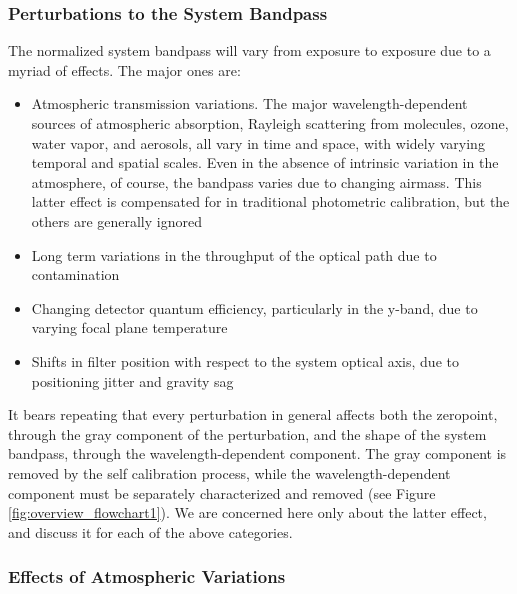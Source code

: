 \documentclass[12pt,preprint]{aastex}
\begin{document}
\subsubsection{Perturbations to the System Bandpass}
The normalized system bandpass will vary from exposure to exposure due to a myriad of effects.  The major ones are:
\begin{itemize}
\item{Atmospheric transmission variations.  The major wavelength-dependent sources of atmospheric absorption, Rayleigh scattering from molecules, ozone, water vapor, and aerosols, all vary in time and space, with widely varying temporal and spatial scales.  Even in the absence of intrinsic variation in the atmosphere, of course, the bandpass varies due to changing airmass.  This latter effect is compensated for in traditional photometric calibration, but the others are generally ignored}
\item{Long term variations in the throughput of the optical path due to contamination}
\item{Changing detector quantum efficiency, particularly in the y-band, due to varying focal plane temperature}
\item{Shifts in filter position with respect to the system optical axis, due to positioning jitter and gravity sag}
\end{itemize}

It bears repeating that every perturbation in general affects both the zeropoint, through the gray component of the perturbation, and the shape of the system bandpass, through the wavelength-dependent component.  The gray component is removed by the self calibration process, while the wavelength-dependent component must be separately characterized and removed (see Figure \ref{fig:overview_flowchart1}).  We are concerned here only about the latter effect, and discuss it for each of the above categories.

\subsubsection{Effects of Atmospheric Variations}
\end{document}
